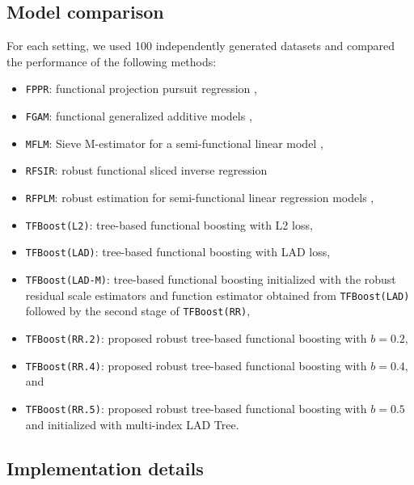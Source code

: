 \documentclass{article}
\begin{document}
\subsection{Model comparison}
For each setting, we used 100 independently generated datasets and compared the performance of the following methods: 

\begin{itemize}
 \setlength\itemsep{0.1em}
\item \texttt{FPPR}: functional projection pursuit regression \citep{ferraty2013functional},
\item \texttt{FGAM}: functional generalized additive models \citep{mclean2014functional}, 
\item \texttt{MFLM}: Sieve M-estimator for a semi-functional linear model \citep{huang2015sieve},
\item \texttt{RFSIR}: robust functional sliced inverse regression \citep{wang2017robust}
\item \texttt{RFPLM}: robust estimation for semi-functional linear regression models \citep{boente2020robust},
\item  \texttt{TFBoost(L2)}:  tree-based functional boosting with L2 loss,
\item  \texttt{TFBoost(LAD)}:  tree-based functional boosting with LAD loss,
\item  \texttt{TFBoost(LAD-M)}:  tree-based functional boosting initialized with the robust residual scale estimators and function estimator obtained from \texttt{TFBoost(LAD)} followed by the second stage of \texttt{TFBoost(RR)}, 
\item  \texttt{TFBoost(RR.2)}:  proposed robust  tree-based functional boosting with $b = 0.2$, 
\item \texttt{TFBoost(RR.4)}:  proposed robust  tree-based functional boosting with $b = 0.4$, and
\item \texttt{TFBoost(RR.5)}:  proposed robust  tree-based functional boosting with $b = 0.5$ and initialized with multi-index LAD Tree. 
\end{itemize}

\subsection{Implementation details} \label{imp}
\end{document}
